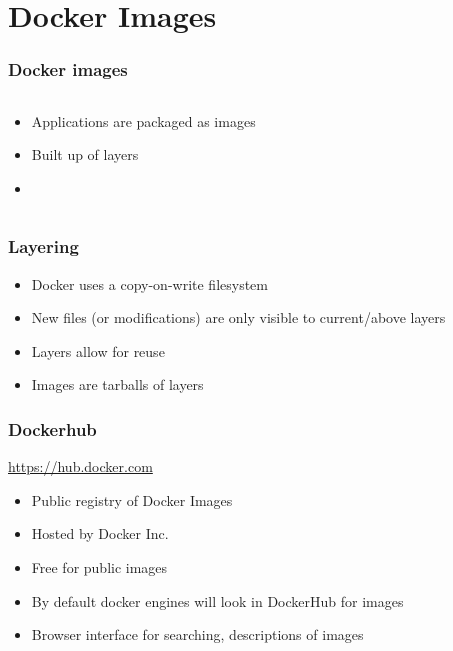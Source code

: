 \documentclass[aspectratio=169,11pt,hyperref={colorlinks=true}]{beamer}
\begin{document}
\section{Docker Images}
\begin{frame}
    \frametitle{Docker images}
    \begin{columns}[T]
        \begin{column}{.48\textwidth}
            \begin{itemize}
                \item Applications are packaged as images
                \item Built up of layers
                \item
            \end{itemize}
        \end{column}
        \begin{column}{.48\textwidth}
 
        \end{column}
    \end{columns}
\end{frame}

\begin{frame}
    \frametitle{Layering}
    \begin{itemize}
        \item Docker uses a copy-on-write filesystem
        \item New files (or modifications) are only visible to current/above layers
        \item Layers allow for reuse
        \item Images are tarballs of layers
    \end{itemize}
\end{frame}

\begin{frame}
    \frametitle{Dockerhub}
    \href{https:/hub.docker.com}{https://hub.docker.com}
    \begin{itemize}
        \item Public registry of Docker Images
        \item Hosted by Docker Inc.
        \item Free for public images
        \item By default docker engines will look in DockerHub for images
        \item Browser interface for searching, descriptions of images
    \end{itemize}
\end{frame}
\end{document}
